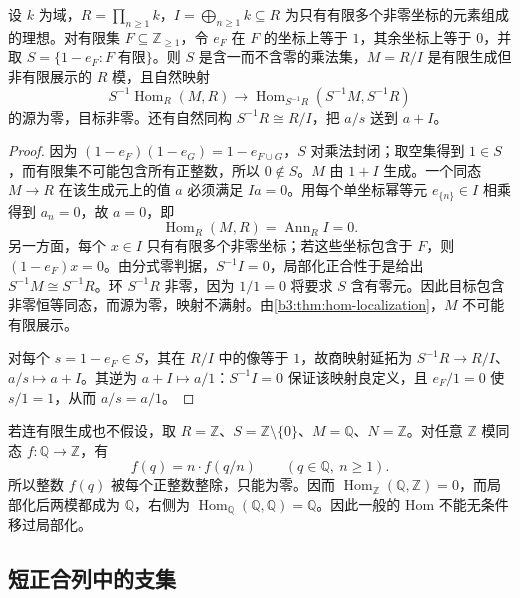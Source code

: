 \begin{proposition}\label{b3:prop:hom-localization-fg-counterexample}
	设 \(k\) 为域，\(R=\prod_{n\ge1}k\)，\(I=\bigoplus_{n\ge1}k\subseteq R\) 为只有有限多个非零坐标的元素组成的理想。对有限集 \(F\subseteq\mathbb Z_{\ge1}\)，令 \(e_F\) 在 \(F\) 的坐标上等于 \(1\)，其余坐标上等于 \(0\)，并取 \(S=\{1-e_F:F\;\text{有限}\}\)。则 \(S\) 是含一而不含零的乘法集，\(M=R/I\) 是有限生成但非有限展示的 \(R\) 模，且自然映射
	\[
		S^{-1}\operatorname{Hom}_R(M,R)\longrightarrow \operatorname{Hom}_{S^{-1}R}(S^{-1}M,S^{-1}R)
	\]
	的源为零，目标非零。还有自然同构 \(S^{-1}R\cong R/I\)，把 \(a/s\) 送到 \(a+I\)。
\end{proposition}
\begin{proof}
	因为 \((1-e_F)(1-e_G)=1-e_{F\cup G}\)，\(S\) 对乘法封闭；取空集得到 \(1\in S\)，而有限集不可能包含所有正整数，所以 \(0\notin S\)。\(M\) 由 \(1+I\) 生成。一个同态 \(M\to R\) 在该生成元上的值 \(a\) 必须满足 \(Ia=0\)。用每个单坐标幂等元 \(e_{\{n\}}\in I\) 相乘得到 \(a_n=0\)，故 \(a=0\)，即
	\[
		\operatorname{Hom}_R(M,R)=\operatorname{Ann}_R I=0.
	\]
	另一方面，每个 \(x\in I\) 只有有限多个非零坐标；若这些坐标包含于 \(F\)，则 \((1-e_F)x=0\)。由分式零判据，\(S^{-1}I=0\)，局部化正合性于是给出 \(S^{-1}M\cong S^{-1}R\)。环 \(S^{-1}R\) 非零，因为 \(1/1=0\) 将要求 \(S\) 含有零元。因此目标包含非零恒等同态，而源为零，映射不满射。由\cref{b3:thm:hom-localization}，\(M\) 不可能有限展示。

	对每个 \(s=1-e_F\in S\)，其在 \(R/I\) 中的像等于 \(1\)，故商映射延拓为 \(S^{-1}R\to R/I\)、\(a/s\mapsto a+I\)。其逆为 \(a+I\mapsto a/1\)：\(S^{-1}I=0\) 保证该映射良定义，且 \(e_F/1=0\) 使 \(s/1=1\)，从而 \(a/s=a/1\)。
\end{proof}

若连有限生成也不假设，取 \(R=\mathbb Z\)、\(S=\mathbb Z\setminus\{0\}\)、\(M=\mathbb Q\)、\(N=\mathbb Z\)。对任意 \(\mathbb Z\) 模同态 \(f:\mathbb Q\rightarrow\mathbb Z\)，有
\[
	f(q)=n\cdot f(q/n)\qquad(q\in\mathbb Q,\ n\ge1).
\]
所以整数 \(f(q)\) 被每个正整数整除，只能为零。因而 \(\operatorname{Hom}_{\mathbb Z}(\mathbb Q,\mathbb Z)=0\)，而局部化后两模都成为 \(\mathbb Q\)，右侧为 \(\operatorname{Hom}_{\mathbb Q}(\mathbb Q,\mathbb Q)=\mathbb Q\)。因此一般的 Hom 不能无条件移过局部化。

\subsection{短正合列中的支集}
\label{b3:subsec:0203:03}

